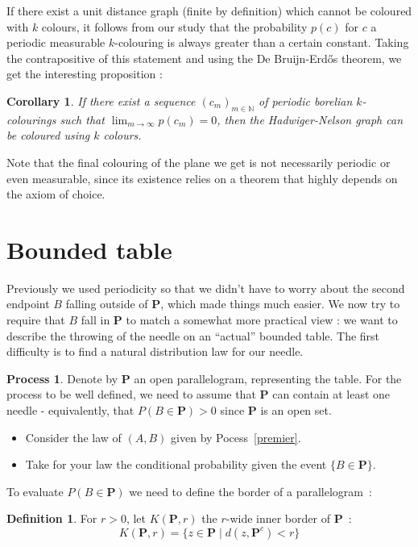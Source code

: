 \documentclass[a4paper,11pt]{article}
\newtheorem{cons}{Corollary}
\theoremstyle{definition}
\newtheorem{definition}{Definition}
\newtheorem{process}{Process}
\theoremstyle{remark}
\begin{document}
If there exist a unit distance graph (finite by definition) which cannot 
be coloured with $k$ colours, it 
follows from our study that the probability $p(c)$ for $c$ a periodic measurable 
$k$-colouring is always greater than a certain constant. Taking the 
contrapositive of this statement and using the De Bruijn-Erdős theorem, we get  
the interesting proposition :
\begin{cons} \label{suite}
 If there exist a sequence $(c_m)_{m \in \mathbb{N}}$ of periodic borelian 
 $k$-colourings such that $\lim_{m \to \infty} p(c_m) = 0$, then the 
 Hadwiger-Nelson graph can be coloured using $k$ colours.
\end{cons}
Note that the final colouring of the plane we get is not necessarily periodic 
or even measurable, since its existence relies on a theorem that highly depends 
on the axiom of choice.

\section{Bounded table} \label{fini}

Previously we used periodicity so that we didn't have to worry about the second 
endpoint $B$ falling outside of $\mathbf{P}$, which made things much easier. We now 
try to require that $B$ fall in $\mathbf{P}$ to match a somewhat more practical 
view : we want to describe the throwing of the needle on an ``actual'' bounded 
table. The first difficulty is to find a natural distribution law for our needle.

\begin{process} \label{encore}
Denote by $\mathbf{P}$ an open parallelogram, representing the table. For the 
process to be well defined, we need to assume that $\mathbf{P}$ can contain at
least one needle - equivalently, that $P(B \in \mathbf{P}) > 0$ since $\mathbf{P}$ 
is an open set.
\begin{itemize}
\item Consider the law of $(A,B)$ given by Pocess~\ref{premier}.
\item Take for your law the conditional probability given the event 
$\{B \in \mathbf{P} \}$.
\end{itemize}
\end{process}

To evaluate $P(B \in \mathbf{P})$ we need to define the border of a parallelogram~:
\begin{definition}
For $r>0$, let $K(\mathbf{P},r)$ the $r$-wide inner border of $\mathbf{P}$~:
\[K(\mathbf{P},r) = \{ z \in \mathbf{P} \mid d(z,\mathbf{P}^c) < r\} \] 
\end{definition}
\end{document}

